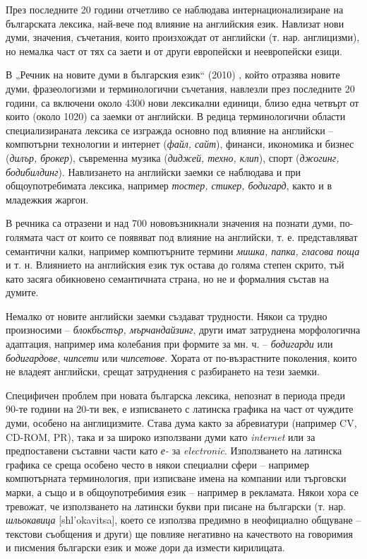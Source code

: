 \documentclass[]{../../metanetpaper}
\begin{document}
\begin{multicols}{2}
През последните 20 години отчетливо се наблюдава интернационализиране на българската лексика, най-вече под влияние на английския език. Навлизат нови думи, значения, съчетания, които произхождат от английски (т. нар. англицизми), но немалка част от тях са заети и от други европейски и неевропейски езици.

В „Речник на новите думи в българския език“ (2010) \cite{NWDict}, който отразява новите думи, фразеологизми и
 терминологични съчетания, навлезли през последните 20 години,
 са включени около 4300 нови лексикални единици,
 близо една четвърт от които (около 1020) са заемки от
 английски. В редица терминологични области
 специализираната лексика се изгражда основно под
 влияние на английски – компютърни технологии и
 интернет ({\it файл, сайт}), финанси, икономика и бизнес
 ({\it дилър, брокер}), съвременна музика ({\it диджей, техно, клип}),
 спорт ({\it джогинг, бодибилдинг}). Навлизането на английски
 заемки се наблюдава и при общоупотребимата лексика, например {\it тостер, стикер, бодигард}, както и в младежкия
 жаргон.

В речника са отразени и над 700 нововъзникнали значения на познати думи, по-голямата част от които се появяват под влияние на английски, т. е. представляват
 семантични калки, например компютърните термини
\textit{мишка, папка, гласова поща} и т. н. Влиянието на
 английския език тук остава до голяма степен скрито, тъй
 като засяга обикновено семантичната страна, но не и
 формалния състав на думите. 

Немалко от новите
 английски заемки създават трудности. Някои са трудно
 произносими – {\it блокбъстър, мърчандайзинг}, други имат
 затруднена морфологична адаптация, например има
 колебания при формите за мн. ч. – {\it бодигарди} или
{\it бодигардове}, {\it чипсети} или {\it чипсетове}. Хората от по-възрастните поколения, които
 не владеят английски, срещат затруднения с разбирането на тези заемки.

Специфичен проблем при новата българска лексика, непознат в периода преди 90-те години на 20-ти век, е изписването с латинска графика на част от чуждите думи, особено на англицизмите. Става дума както за абревиатури (например CV, CD-ROM, PR), така и за широко използвани думи като \textit{internet} или за предпоставени съставни части като \textit{е-} за {\it electronic}. Използването на латинска графика се среща
 особено често в някои специални сфери – например компютърната терминология, при изписване имена на компании или търговски марки, а също и в общоупотребимия език – например в рекламата.
 Някои хора се тревожат, че използването на латински букви при писане на български (т. нар. \textit{шльокавица} [shl'okavitsa], което се използва предимно в неофициално общуване – текстови съобщения и други) \cite{shlyokavica} ще повлияе негативно на качеството на говоримия и писмения български език и може дори да измести кирилицата.


\end{multicols}
\end{document}

